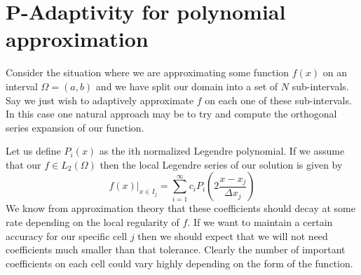 \documentclass[10]{amsart}
\begin{document}
% 
% 
\section{P-Adaptivity for polynomial approximation}
Consider the situation where we are approximating
some function $f(x)$ on an interval $\Omega=(a,b)$ and we have split our domain into a set of $N$ sub-intervals.
Say we just wish
to adaptively approximate $f$ on each one of these sub-intervals. In this case one natural approach may be to try and
compute the orthogonal series expansion of our function. 

Let us define $P_i(x)$ as the ith normalized Legendre polynomial. If we assume that our $f \in L_2 (\Omega)$
then the local Legendre series of our solution is given by 
$$f(x)|_{x \in I_j}=\sum_{i=1}^\infty c_i P_i(2\frac{x-x_j}{\Delta x_j})$$
We know from approximation theory that these coefficients should decay at some rate
depending on the local regularity of $f$. If we want to maintain a certain
accuracy for our specific cell $j$ then we should expect that we will not need coefficients much smaller than that
tolerance.
Clearly the number of important coefficients on each cell
could vary highly depending on the form of the function.
\end{document}
